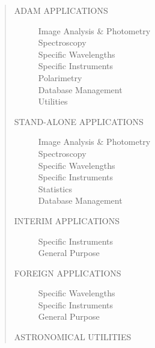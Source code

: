 \begin{quote}
\begin{description}
\item [ADAM APPLICATIONS] \mbox{}

\begin{description}
\item [Image Analysis \& Photometry] \mbox{}
\item [Spectroscopy] \mbox{}
\item [Specific Wavelengths] \mbox{}
\item [Specific Instruments] \mbox{}
\item [Polarimetry] \mbox{}
\item [Database Management] \mbox{}
\item [Utilities] \mbox{}
\end{description}

\item [STAND-ALONE APPLICATIONS] \mbox{}

\begin{description}
\item [Image Analysis \& Photometry] \mbox{}
\item [Spectroscopy] \mbox{}
\item [Specific Wavelengths] \mbox{}
\item [Specific Instruments] \mbox{}
\item [Statistics] \mbox{}
\item [Database Management] \mbox{}
\end{description}

\item [INTERIM APPLICATIONS] \mbox{}

\begin{description}
\item [Specific Instruments] \mbox{}
\item [General Purpose] \mbox{}
\end{description}

\item [FOREIGN APPLICATIONS] \mbox{}

\begin{description}
\item [Specific Wavelengths] \mbox{}
\item [Specific Instruments] \mbox{}
\item [General Purpose] \mbox{}
\end{description}

\item [ASTRONOMICAL UTILITIES] \mbox{}


\end{description}
\end{quote}
